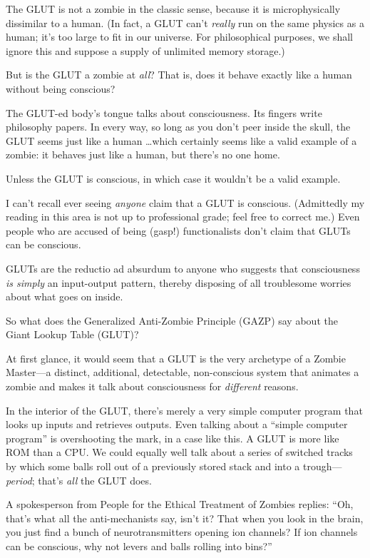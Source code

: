 {
 The GLUT is not a zombie in the classic sense, because it is
microphysically dissimilar to a human. (In fact, a GLUT
can't \textit{really} run on the same physics as a
human; it's too large to fit in our universe. For
philosophical purposes, we shall ignore this and suppose a supply of
unlimited memory storage.)}

{
 But is the GLUT a zombie at \textit{all}? That is, does it behave
exactly like a human without being conscious?}

{
 The GLUT-ed body's tongue talks about
consciousness. Its fingers write philosophy papers. In every way, so
long as you don't peer inside the skull, the GLUT seems
just like a human \ldots which certainly seems like a valid example of a
zombie: it behaves just like a human, but there's no
one home.}

{
 Unless the GLUT is conscious, in which case it
wouldn't be a valid example.}

{
 I can't recall ever seeing \textit{anyone} claim
that a GLUT is conscious. (Admittedly my reading in this area is not up
to professional grade; feel free to correct me.) Even people who are
accused of being (gasp!) functionalists don't claim
that GLUTs can be conscious.}

{
 GLUTs are the reductio ad absurdum to anyone who suggests that
consciousness \textit{is simply} an input-output pattern, thereby
disposing of all troublesome worries about what goes on inside.}

{
 So what does the Generalized Anti-Zombie Principle (GAZP) say
about the Giant Lookup Table (GLUT)?}

{
 At first glance, it would seem that a GLUT is the very archetype
of a Zombie Master---a distinct, additional, detectable, non-conscious
system that animates a zombie and makes it talk about consciousness for
\textit{different} reasons.}

{
 In the interior of the GLUT, there's merely a very
simple computer program that looks up inputs and retrieves outputs.
Even talking about a ``simple computer
program'' is overshooting the mark, in a case like
this. A GLUT is more like ROM than a CPU. We could equally well talk
about a series of switched tracks by which some balls roll out of a
previously stored stack and into a trough---\textit{period};
that's \textit{all} the GLUT does.}

{
 A spokesperson from People for the Ethical Treatment of Zombies
replies: ``Oh, that's what all the
anti-mechanists say, isn't it? That when you look in
the brain, you just find a bunch of neurotransmitters opening ion
channels? If ion channels can be conscious, why not levers and balls
rolling into bins?''}

